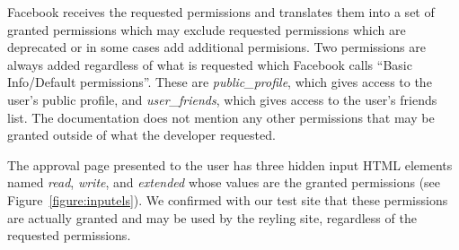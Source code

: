 \documentclass[10pt]{sig-alternate-10pt}
\begin{document}
Facebook receives the requested permissions and translates them into a set of granted permissions which may exclude requested permissions which are deprecated or in some cases add additional permisions. 
Two permissions are always added regardless of what is requested which Facebook calls ``Basic Info/Default permissions''\cite{fbpermsinstructions}. These are \emph{public\_profile}, which gives access to the user's public profile, and \emph{user\_friends}, which gives access to the user's friends list. The documentation does not mention any other permissions that may be granted outside of what the developer requested.

\label{sec:inputels}


The approval page presented to the user has three hidden input HTML elements named \emph{read}, \emph{write}, and \emph{extended} whose values are the granted permissions (see Figure~\ref{figure:inputels}).
We confirmed with our test site that these permissions are actually granted and may be used by the reyling site, regardless of the requested permissions.
\end{document}
